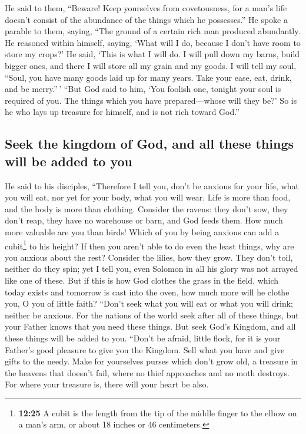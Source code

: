  He said to them, ``Beware! Keep yourselves from
covetousness, for a man's life doesn't consist of the abundance of the
things which he possesses.''  He spoke a parable to them,
saying, ``The ground of a certain rich man produced abundantly.
 He reasoned within himself, saying, `What will I do,
because I don't have room to store my crops?'  He said,
`This is what I will do. I will pull down my barns, build bigger ones,
and there I will store all my grain and my goods.  I will
tell my soul, ``Soul, you have many goods laid up for many years. Take
your ease, eat, drink, and be merry.''\,'  ``But God said
to him, `You foolish one, tonight your soul is required of you. The
things which you have prepared---whose will they be?'  So
is he who lays up treasure for himself, and is not rich toward God.''

\hypertarget{seek-the-kingdom-of-god-and-all-these-things-will-be-added-to-you}{%
\subsection{Seek the kingdom of God, and all these things will be added
to
you}\label{seek-the-kingdom-of-god-and-all-these-things-will-be-added-to-you}}

 He said to his disciples, ``Therefore I tell you, don't
be anxious for your life, what you will eat, nor yet for your body, what
you will wear.  Life is more than food, and the body is
more than clothing.  Consider the ravens: they don't sow,
they don't reap, they have no warehouse or barn, and God feeds them. How
much more valuable are you than birds!  Which of you by
being anxious can add a cubit\footnote{\textbf{12:25} A cubit is the
  length from the tip of the middle finger to the elbow on a man's arm,
  or about 18 inches or 46 centimeters.} to his height? 
If then you aren't able to do even the least things, why are you anxious
about the rest?  Consider the lilies, how they grow. They
don't toil, neither do they spin; yet I tell you, even Solomon in all
his glory was not arrayed like one of these.  But if this
is how God clothes the grass in the field, which today exists and
tomorrow is cast into the oven, how much more will he clothe you, O you
of little faith?  ``Don't seek what you will eat or what
you will drink; neither be anxious.  For the nations of
the world seek after all of these things, but your Father knows that you
need these things.  But seek God's Kingdom, and all these
things will be added to you.  ``Don't be afraid, little
flock, for it is your Father's good pleasure to give you the Kingdom.
 Sell what you have and give gifts to the needy. Make for
yourselves purses which don't grow old, a treasure in the heavens that
doesn't fail, where no thief approaches and no moth destroys.
 For where your treasure is, there will your heart be
also.

